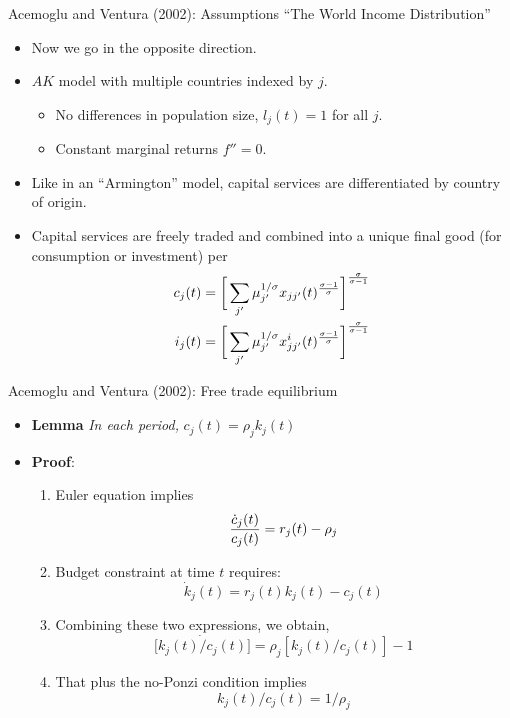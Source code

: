 \documentclass[10pt,notes=hide]{beamer}
\begin{document}
\begin{frame}{Acemoglu and Ventura (2002): Assumptions}
{\small ``The World Income Distribution''}
\begin{itemize}
\item Now we go in the opposite direction. 
\item $AK$ model with multiple countries indexed by $j$.
	\begin{itemize}
	\item No differences in population size, $l_j(t) = 1$ for all $j$.
	\item Constant marginal returns $f'' = 0$. 
	\end{itemize}
\item Like in an ``Armington'' model, capital services are differentiated by country of origin. 
\item Capital services are freely traded and combined into a unique final good (for consumption or investment) per
\begin{align*}
	c_j(t) &= \bigg[ \sum_{j'} \mu_{j'}^{1/ \sigma} x_{jj'}(t)^{\sigma - 1 \over \sigma} \bigg]^{\sigma \over \sigma - 1} \\ 
	i_j(t) &= \bigg[ \sum_{j'} \mu_{j'}^{1/\sigma} x_{jj'}^i(t)^{\sigma - 1 \over \sigma} \bigg]^{\sigma \over \sigma - 1}
\end{align*}
\end{itemize}
\end{frame}
\begin{frame}{Acemoglu and Ventura (2002): Free trade equilibrium}
\begin{itemize}
\item {\bf Lemma} \emph{ In each period,} $c_j(t) = \rho_j k_j(t)$
\item {\bf Proof}:
	\begin{enumerate}
	\item Euler equation implies
	\[
	{\dot c_j(t) \over c_j(t) } = r_j(t) - \rho_j
	\]
	\item Budget constraint at time $t$ requires:
	\[
	\dot k_j(t) = r_j(t) k_j(t) - c_j(t)
	\]
	\item Combining these two expressions, we obtain,
	\[
	\dot{ \big[ k_j(t) / c_j(t) \big] } = \rho_j[k_j(t) / c_j(t)] - 1 
	\]
	\item That plus the no-Ponzi condition implies
	\[
	k_j(t) / c_j(t) = 1/\rho_j
	\]
	\end{enumerate}
\end{itemize}
\end{frame}
\end{document}
